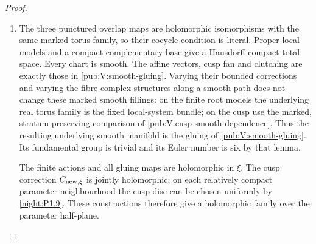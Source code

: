 \documentclass[11pt,a4paper]{article}
\numberwithin{equation}{section}
\theoremstyle{definition}
\begin{document}
\begin{proof}
\begin{enumerate}[label=\arabic*.]
 applies to this bounded
holomorphic correction. It gives smoothness, proper discontinuity
and properness in the prescribed marking. We glue with zero cusp
translation.

\item The three punctured overlap maps are holomorphic isomorphisms
with the same marked torus family, so their cocycle condition
is literal.  Proper local models and a compact complementary
base give a Hausdorff compact total space.  Every chart is
smooth.  The affine vectors, cusp fan and clutching are exactly
those in \cref{pub:V:smooth-gluing}.  Varying their bounded corrections
and varying the fibre complex structures along a smooth path
does not change these marked smooth fillings: on the finite
root models the underlying real torus family is the fixed
local-system bundle; on the cusp use the marked, stratum-preserving comparison of
\cref{pub:V:cusp-smooth-dependence}.  Thus the resulting underlying smooth manifold
is the gluing of \cref{pub:V:smooth-gluing}. Its fundamental group is trivial and its Euler number is six by that lemma.

The finite actions and all gluing maps are holomorphic in $\xi$.
The cusp correction $C_{{\rm new},\xi}$ is jointly holomorphic;
on each relatively compact parameter neighbourhood the cusp disc
can be chosen uniformly by \cref{night:P1.9}. These constructions
therefore give a holomorphic family over the parameter half-plane.

\end{enumerate}
\end{proof}
\end{document}
